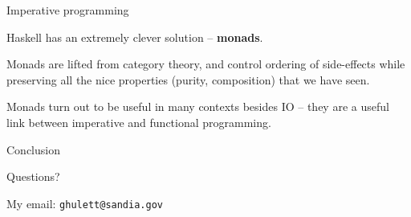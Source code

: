 %
\begin{frame}[fragile]{Imperative programming}

Haskell has an extremely clever solution -- \textbf{monads}.

Monads are lifted from category theory, and control ordering of side-effects
while preserving all the nice properties (purity, composition) that we have
seen.

Monads turn out to be useful in many contexts besides IO -- they are a useful
link between imperative and functional programming.

\end{frame}

%
\begin{frame}{Conclusion}

Questions?

My email: \texttt{ghulett@sandia.gov}

\end{frame}
